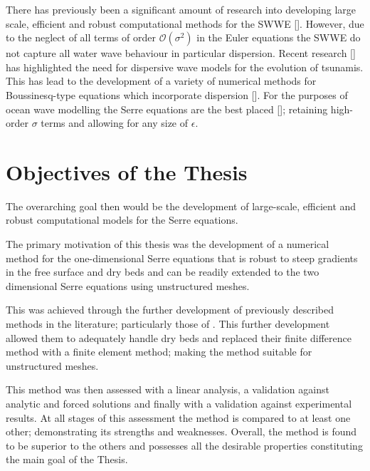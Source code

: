 There has previously been a significant amount of research into developing large scale, efficient and robust computational methods for the SWWE []. However, due to the neglect of all terms of order $\mathcal{O}\left(\sigma ^2\right)$ in the Euler equations the SWWE do not capture all water wave behaviour in particular dispersion. Recent research [] has highlighted the need for dispersive wave models for the evolution of tsunamis. This has lead to the development of a variety of numerical methods for Boussinesq-type equations which incorporate dispersion []. For the purposes of ocean wave modelling the Serre equations are the best placed []; retaining high-order $\sigma$ terms and allowing for any size of $\epsilon$. 



\section{Objectives of the Thesis}
%
%

The overarching goal then would be the development of large-scale, efficient and robust computational models for the Serre equations.

The primary motivation of this thesis was the development of a numerical method for the one-dimensional Serre equations that is robust to steep gradients in the free surface and dry beds and can be readily extended to the two dimensional Serre equations using unstructured meshes. 

This was achieved through the further development of previously described methods in the literature; particularly those of \citet{Zoppou-2014}. This further development allowed them to adequately handle dry beds and replaced their finite difference method with a finite element method; making the method suitable for unstructured meshes. 

This method was then assessed with a linear analysis, a validation against analytic and forced solutions and finally with a validation against experimental results. At all stages of this assessment the method is compared to at least one other; demonstrating its strengths and weaknesses. Overall, the method is found to be superior to the others and possesses all the desirable properties constituting the main goal of the Thesis.  

